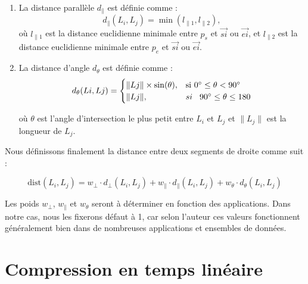 \begin{appendix}
\begin{enumerate}
    \item La distance parallèle $d_{\parallel}$ est définie comme :
        \begin{equation}
            d_{\parallel}(L_i, L_j) = \min(l_{\parallel 1}, l_{\parallel 2}),
        \end{equation}
        où $l_{\parallel 1}$ est la distance euclidienne minimale entre $p_s$ et $\overrightarrow{si}$ ou $\overrightarrow{ei}$, et $l_{\parallel 2}$ est la distance euclidienne minimale entre $p_e$ et $\overrightarrow{si}$ ou $\overrightarrow{ei}$.


    \item La distance d'angle $d_{\theta}$ est définie comme :
        \begin{equation}
            d_{\theta}(Li, Lj ) =
            \begin{cases}
                \| Lj \| \times \sin({\theta}), & \text{si } 0^\circ \le {\theta} < 90^\circ\ \\
                \| Lj \|, & si \hspace{0.3cm} 90^\circ \le {\theta} \le 180
            \end{cases}
        \end{equation}

        où $\theta$ est l'angle d'intersection le plus petit entre $L_i$ et $L_j$ et $\| L_j \|$ est la longueur de $L_j$.



\end{enumerate}

\vspace{0.5cm}
Nous définissons finalement la distance entre deux segments de droite comme suit : 

\[
\mathrm{dist}(L_i,L_j) = w_\perp \cdot d_\perp(L_i,L_j) + w_{\parallel} \cdot d_{\parallel}(L_i,L_j) + w_\theta \cdot d_\theta(L_i,L_j)
\]

Les poids $w_\perp$, $w_{\parallel}$ et $w_\theta$ seront à déterminer en fonction des applications. Dans notre cas, nous les fixerons défaut à 1, car selon l'auteur ces valeurs fonctionnent généralement bien dans de nombreuses applications et ensembles de données.

\section{Compression en temps linéaire}
\label{an:compression_lin}


\end{appendix}
